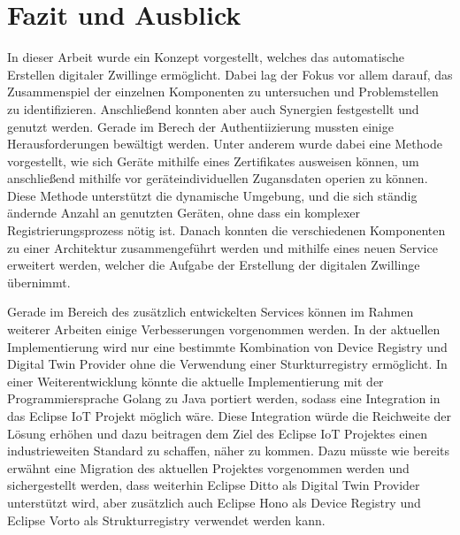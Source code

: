 \documentclass[
	12pt,
	BCOR=5mm,
	DIV=12,
	headinclude=on,
	footinclude=off,
	parskip=half,
	bibliography=totoc,
	listof=entryprefix,
	toc=listof,
	numbers=noenddot,
	plainfootsepline
]{scrreprt}
\begin{document}




\chapter{Fazit und Ausblick}

In dieser Arbeit wurde ein Konzept vorgestellt, welches das automatische Erstellen digitaler Zwillinge ermöglicht. Dabei lag der Fokus vor allem darauf, das Zusammenspiel der einzelnen Komponenten zu untersuchen und Problemstellen zu identifizieren. Anschließend konnten aber auch Synergien festgestellt und genutzt werden. Gerade im Berech der Authentiizierung mussten einige Herausforderungen bewältigt werden. Unter anderem wurde dabei eine Methode vorgestellt, wie sich Geräte mithilfe eines Zertifikates ausweisen können, um anschließend mithilfe vor geräteindividuellen Zugansdaten operien zu können. Diese Methode unterstützt die dynamische Umgebung, und die sich ständig ändernde Anzahl an genutzten Geräten, ohne dass ein komplexer Registrierungsprozess nötig ist. Danach konnten die verschiedenen Komponenten zu einer Architektur zusammengeführt werden und mithilfe eines neuen Service erweitert werden, welcher die Aufgabe der Erstellung der digitalen Zwillinge übernimmt. 

Gerade im Bereich des zusätzlich entwickelten Services können im Rahmen weiterer Arbeiten einige Verbesserungen vorgenommen werden. In der aktuellen Implementierung wird nur eine bestimmte Kombination von Device Registry und Digital Twin Provider ohne die Verwendung einer Sturkturregistry ermöglicht. In einer Weiterentwicklung könnte die aktuelle Implementierung mit der Programmiersprache Golang zu Java portiert werden, sodass eine Integration in das Eclipse IoT Projekt möglich wäre. Diese Integration würde die Reichweite der Lösung erhöhen und dazu beitragen dem Ziel des Eclipse IoT Projektes einen industrieweiten Standard zu schaffen, näher zu kommen. Dazu müsste wie bereits erwähnt eine Migration des aktuellen Projektes vorgenommen werden und sichergestellt werden, dass weiterhin Eclipse Ditto als Digital Twin Provider unterstützt wird, aber zusätzlich auch Eclipse Hono als Device Registry und Eclipse Vorto als Strukturregistry verwendet werden kann. 
\end{document}
